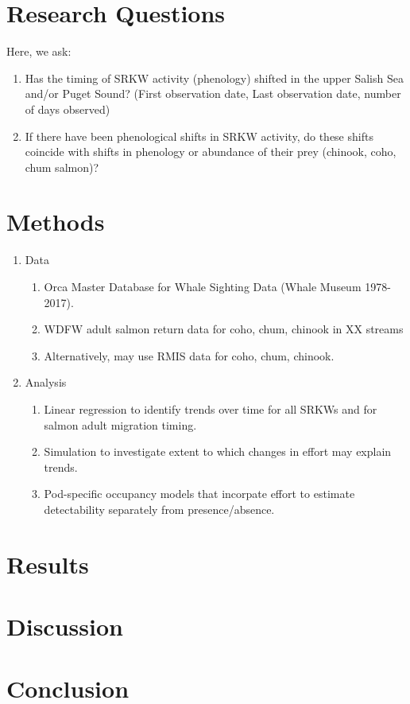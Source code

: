 \documentclass{article}
\begin{document}
\section* {Research Questions}
Here, we ask:
\begin{enumerate}
\item Has the timing of SRKW activity (phenology) shifted in the upper Salish Sea and/or Puget Sound? (First observation date, Last observation date, number of days observed)
\item If there have been phenological shifts in SRKW activity, do these shifts coincide with shifts in phenology or abundance of their prey (chinook, coho, chum salmon)?
\end{enumerate}


\section* {Methods}
\begin{enumerate}
\item Data
\begin{enumerate}
\item Orca Master Database for Whale Sighting Data (Whale Museum 1978-2017).
\item WDFW adult salmon return data for coho, chum, chinook in XX streams
\item Alternatively, may use RMIS data for coho, chum, chinook.
\end{enumerate}
\item Analysis
\begin{enumerate}
\item Linear regression to identify trends over time for all SRKWs and for salmon adult migration timing.
\item Simulation to investigate extent to which changes in effort may explain trends.
\item Pod-specific occupancy models that incorpate effort to estimate detectability separately from presence/absence.
\end{enumerate}
\end{enumerate}
\section*{Results}
\section*{Discussion}
\section*{Conclusion}
\end{document}
